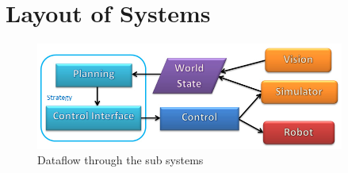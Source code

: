 \section{Layout of Systems}
\label{apx:systems}

\begin{figure}[h]
  \centering
  \includegraphics[width=4in]{flowDiagram.jpg}
  \caption{Dataflow through the sub systems}
\end{figure}
